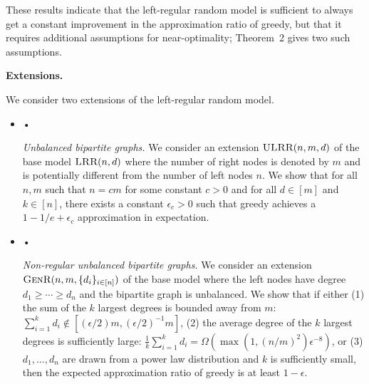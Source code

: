 These results indicate that the left-regular random model is sufficient to always get a constant improvement in the approximation ratio of greedy, but that it requires additional assumptions for near-optimality; Theorem 2 gives two such assumptions.\par





\par\medskip\noindent\textbf{Extensions.}\par




We consider two extensions of the left-regular random model.\par




\begin{itemize}


\item[] • 


\emph{Unbalanced bipartite graphs.}
We consider an extension $\textsc{ULRR}(n,m,d)$ of the base model $\textsc{LRR}(n,d)$ where the number of right nodes is denoted by $m$ and is potentially different from the number of left nodes $n$. We show that for all $n,m$ such that $n=cm$ for some constant $c>0$ and for all $d\in[m]$ and $k\in[n]$, there exists a constant $\epsilon_{c}>0$ such that greedy achieves a $1-1/e+\epsilon_{c}$ approximation in expectation.\par




\item[] • 


\emph{Non-regular unbalanced bipartite graphs.}
We consider an extension $\textsc{GenR}(n,m,\{d_{i}\}_{i\in[n]})$ of the base model where the left nodes have degree $d_{1}\geq\cdots\geq d_{n}$ and the bipartite graph is unbalanced. We show that if either (1) the sum of the $k$ largest degrees is bounded away from $m$: $\sum_{i=1}^{k}d_{i}\not\in[(\epsilon/2)m,(\epsilon/2)^{-1}m]$, (2) the average degree of the $k$ largest degrees is sufficiently large: $\frac{1}{k}\sum_{i=1}^{k}d_{i}=\Omega(\max(1,(n/m)^{2})\epsilon^{-8})$, or (3) $d_{1},\ldots,d_{n}$ are drawn from a power law distribution and $k$ is sufficiently small, then the expected approximation ratio of greedy is at least $1-\epsilon$.\par




\end{itemize}





